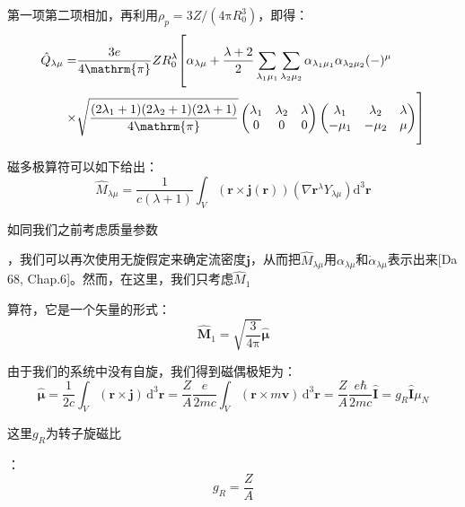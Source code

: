 \begin{booknote*}
第一项第二项相加，再利用$\rho_{p}=3Z/(4\mathrm{\pi}R^{3}_{0})$，即得：
\begin{align*}
\hat{Q}_{\lambda\mu}= & \frac{3e}{4\mathrm{\pi}}ZR^{\lambda}_{0}\Bigggl[\alpha_{\lambda\mu}+\frac{\lambda+2}{2}\sum_{\lambda_{1}\mu_{1}}\sum_{\lambda_{2}\mu_{2}}\alpha_{\lambda_{1}\mu_{1}}\alpha_{\lambda_{2}\mu_{2}}(-)^{\mu}\\
\times & \sqrt{\frac{(2\lambda_{1}+1)(2\lambda_{2}+1)(2\lambda+1)}{4\mathrm{\pi}}}\begin{pmatrix}\lambda_{1} & \lambda_{2} & \lambda\\
0 & 0 & 0
\end{pmatrix}\begin{pmatrix}\lambda_{1} & \lambda_{2} & \lambda\\
-\mu_{1} & -\mu_{2} & \mu
\end{pmatrix}\Bigggr]
\end{align*}
\end{booknote*}
磁多极算符可以如下给出：
\[
\hat{M}_{\lambda\mu}=\frac{1}{c(\lambda+1)}\int_{V}(\boldsymbol{r}\times\boldsymbol{j}(\boldsymbol{r}))(\nabla\boldsymbol{r}^{\lambda}Y_{\lambda\mu})\mathrm{d}^{3}\boldsymbol{r}
\]

如同我们之前考虑质量参数

，我们可以再次使用无旋假定来确定流密度$\boldsymbol{j}$，从而把$\hat{M}_{\lambda\mu}$用$\alpha_{\lambda\mu}$和$\dot{\alpha}_{\lambda\mu}$表示出来{[}Da
68, Chap.6{]}。然而，在这里，我们只考虑$\hat{M}_{1}$

算符，它是一个矢量的形式：
\[
\hat{\boldsymbol{M}}_{1}=\sqrt{\frac{3}{4\mathrm{\pi}}}\hat{\boldsymbol{\mu}}
\]

由于我们的系统中没有自旋，我们得到磁偶极矩为：
\[
\hat{\boldsymbol{\mu}}=\frac{1}{2c}\int_{V}(\boldsymbol{r}\times\boldsymbol{j})\,\mathrm{d}^{3}\boldsymbol{r}=\frac{Z}{A}\frac{e}{2mc}\int_{V}(\boldsymbol{r}\times m\boldsymbol{v})\,\mathrm{d}^{3}\boldsymbol{r}=\frac{Z}{A}\frac{e\hbar}{2mc}\hat{\boldsymbol{I}}=g_{R}\hat{\boldsymbol{I}}\mu_{N}
\]

这里$g_{R}$为转子旋磁比

：
\[
g_{R}=\frac{Z}{A}
\]

